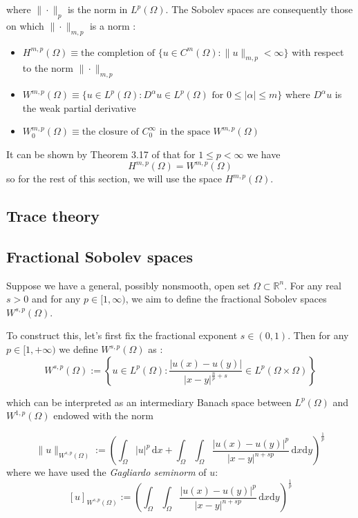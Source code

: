where $\|\cdot\|_p$ is the norm in $L^p(\Omega)$. The Sobolev spaces are consequently those on which $\|\cdot \|_{m, p}$ is a norm \cite{adams2003sobolev}:
\begin{itemize}
    \item $H^{m, p}(\Omega) \equiv \text{the completion of } \{u \in C^m (\Omega) : \|u\|_{m, p} < \infty\}$ with respect to the norm $\|\cdot \|_{m, p}$
    \item $W^{m, p}(\Omega) \equiv \{u \in L^p(\Omega) : D^\alpha u \in L^p(\Omega) \text{ for } 0 \le |\alpha| \le m \}$ where $D^\alpha u$ is the weak partial derivative
    \item $W_0^{m, p}(\Omega) \equiv \text{the closure of }C^\infty_0 \text{ in the space } W^{m, p}(\Omega)$
\end{itemize}

It can be shown by Theorem 3.17 of \cite{adams2003sobolev} that for $1 \le p < \infty$ we have
\[H^{m, p}(\Omega) = W^{m, p}(\Omega)\]
so for the rest of this section, we will use the space $H^{m, p}(\Omega)$. 

\subsection{Trace theory}




\subsection{Fractional Sobolev spaces}
Suppose we have a general, possibly nonsmooth, open set $\Omega \subset \mathbb R^n$. For any real $s > 0$ and for any $p \in [1, \infty)$, we aim to define the fractional Sobolev spaces $W^{s, p}(\Omega)$.

To construct this, let's first fix the fractional exponent $s \in (0, 1)$. Then for any $p \in [1, +\infty)$ we define $W^{s, p}(\Omega)$ as \cite{di2012hitchhikers}:
\[W^{s, p}(\Omega) := \left\{u \in L^p(\Omega) : \frac{|u(x) - u(y)|}{|x-y|^{\frac np + s}} \in L^p(\Omega \times \Omega)\right\}\]

which can be interpreted as an intermediary Banach space between $L^p(\Omega)$ and $W^{1, p}(\Omega)$ endowed with the norm

\[\|u\|_{W^{s, p}(\Omega)} := \left(\int_\Omega |u|^p \,\mathrm dx + \int_\Omega \int_\Omega \frac{|u(x)-u(y)|^p}{|x-y|^{n+sp}}\,\mathrm dx \mathrm dy\right)^{\frac 1p}\]
where we have used the \textit{Gagliardo seminorm} of $u$:
\[[u]_{W^{s, p}(\Omega)} := \left( \int_\Omega \int_\Omega \frac{|u(x)-u(y)|^p}{|x-y|^{n+sp}}\,\mathrm dx \mathrm dy\right)^{\frac 1p}\]



